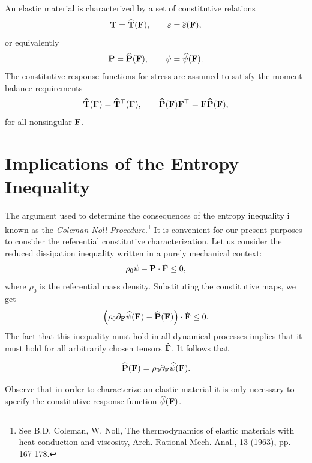 An elastic material is characterized by a set of constitutive relations
\begin{equation}
	\mathbf{T}=\widehat{\mathbf{T}}(\mathbf{F}), \qquad \varepsilon=\widehat{\varepsilon}(\mathbf{F}),
\end{equation}
or equivalently
\begin{equation}
	\mathbf{P}=\widehat{\mathbf{P}}(\mathbf{F}), \qquad \psi=\widehat{\psi}(\mathbf{F}).
\end{equation}
The constitutive response functions for stress are assumed to satisfy the moment balance requirements
\begin{equation}
\widehat{\mathbf{T}}(\mathbf{F})=\widehat{\mathbf{T}}^\top(\mathbf{F}), \qquad \widehat{\mathbf{P}}(\mathbf{F})\mathbf{F}^\top=\mathbf{F}\widehat{\mathbf{P}}(\mathbf{F}),
\end{equation}
for all nonsingular $\mathbf{F}$.

\section{Implications of the Entropy Inequality}
The  argument used to determine the consequences of the entropy inequality i known as the \textit{Coleman-Noll Procedure}.\footnote{See B.D. Coleman, W. Noll, The thermodynamics of elastic materials with heat conduction and viscosity, Arch. Rational Mech. Anal., 13 (1963), pp. 167-178.}
It is convenient for our present purposes to consider the referential constitutive characterization. Let us consider the reduced dissipation inequality  written in  a purely mechanical context:
\begin{equation}
\rho_{0} \dot\psi-\mathbf{P}\cdot\dot{\mathbf{F}}\leq0,
\end{equation}
where $\rho_{0}$ is the referential mass density. Substituting the constitutive maps, we get
\begin{equation}
	\Big(\rho_{0} \partial_{\mathbf{F}}\widehat{\psi}(\mathbf{F})-\widehat{\mathbf{P}}(\mathbf{F})\Big)\cdot\dot{\mathbf{F}}\leq0.
\end{equation}
The fact that this inequality must hold in all dynamical processes implies that it must hold for all arbitrarily chosen tensors $\dot{\mathbf{F}}$. It follows that 
\begin{definition}
	\begin{equation}
\widehat{\mathbf{P}}(\mathbf{F})=\rho_{0} \partial_{\mathbf{F}}\widehat{\psi}(\mathbf{F}).
\end{equation}
\end{definition}

Observe that in order to characterize an elastic material it is only necessary to
specify the  constitutive response function $\widehat{\psi}(\mathbf{F})$.

